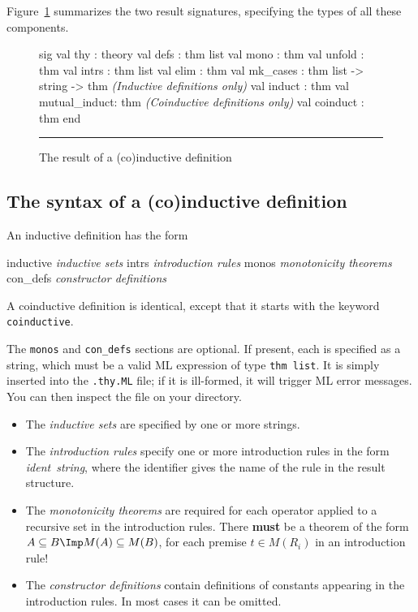 Figure~\ref{def-result-fig} summarizes the two result signatures,
specifying the types of all these components.

\begin{figure}
\begin{ttbox}
sig
val thy          : theory
val defs         : thm list
val mono         : thm
val unfold       : thm
val intrs        : thm list
val elim         : thm
val mk_cases     : thm list -> string -> thm
{\it(Inductive definitions only)} 
val induct       : thm
val mutual_induct: thm
{\it(Coinductive definitions only)}
val coinduct    : thm
end
\end{ttbox}
\hrule
\caption{The result of a (co)inductive definition} \label{def-result-fig}
\end{figure}

\subsection{The syntax of a (co)inductive definition}
An inductive definition has the form
\begin{ttbox}
inductive    {\it inductive sets}
  intrs      {\it introduction rules}
  monos      {\it monotonicity theorems}
  con_defs   {\it constructor definitions}
\end{ttbox}
A coinductive definition is identical, except that it starts with the keyword
{\tt coinductive}.  

The {\tt monos} and {\tt con\_defs} sections are optional.  If present,
each is specified as a string, which must be a valid ML expression of type
{\tt thm list}.  It is simply inserted into the {\tt .thy.ML} file; if it
is ill-formed, it will trigger ML error messages.  You can then inspect the
file on your directory.

\begin{itemize}
\item The {\it inductive sets} are specified by one or more strings.

\item The {\it introduction rules} specify one or more introduction rules in
  the form {\it ident\/}~{\it string}, where the identifier gives the name of
  the rule in the result structure.

\item The {\it monotonicity theorems} are required for each operator
  applied to a recursive set in the introduction rules.  There {\bf must}
  be a theorem of the form $A\subseteq B\Imp M(A)\subseteq M(B)$, for each
  premise $t\in M(R_i)$ in an introduction rule!

\item The {\it constructor definitions} contain definitions of constants
  appearing in the introduction rules.  In most cases it can be omitted.
\end{itemize}

